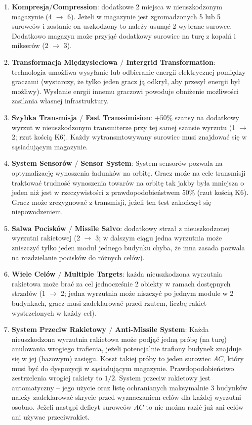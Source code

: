 \documentclass[11pt,a4paper]{article}
\begin{document}
\begin{enumerate}
\item \textbf{Kompresja$/$Compression}: dodatkowe 2 miejsca w nieuszkodzonym magazynie (4 $\to$ 6). Jeżeli w magazynie jest zgromadzonych 5 lub 5 surowców i zostanie on uszkodzony to należy usunąć 2 wybrane surowce. Dodatkowo magazyn może przyjąć dodatkowy surowiec na turę z kopalń i mikserów (2 $\to$ 3).
\item \textbf{Transformacja Międzysieciowa $/$ Intergrid Transformation}: technologia umożliwa wysyłanie lub odbieranie energii elektrycznej pomiędzy graczami (wystarczy, że tylko jeden gracz ją odkrył, aby przesył energii był możliwy). Wysłanie enrgii innemu graczowi powoduje obniżenie możliwości zasilania własnej infrastruktury.
\item \textbf{Szybka Transmisja $/$ Fast Transsimision}: +50\% szansy na dodatkowy wyrzut w nieuszkodzonym transmiterze przy tej samej szansie wyrzutu (1 $\to$ 2; rzut kością K6). Każdy wytransmtowywany surowiec musi znajdować się w sąsiadującym magazynie.
\item \textbf{System Sensorów $/$ Sensor System}: System sensorów pozwala na optymalizację wynoszenia ładunków na orbitę. Gracz może na cele transmisji traktować trudność wynoszenia towarów na orbitę tak jakby była mniejsza o jeden niż jest w rzeczywistości z prawdopodobieństwem 50\% (rzut kością K6). Gracz może zrezygnować z transmisji, jeżeli ten test zakończył się niepowodzeniem.
\item \textbf{Salwa Pocisków $/$ Missile Salvo}: dodatkowy strzał z nieuszkodzonej wyrzutni rakietowej (2 $\to$ 3; w dalszym ciągu jedna wyrzutnia może zniszczyć tylko jeden moduł jednego budynku chyba, że inna zasada pozwala na rozdzielanie pocisków do różnych celów).
\item \textbf{Wiele Celów $/$ Multiple Targets}: każda nieuszkodzona wyrzutnia rakietowa może brać za cel jednocześnie 2 obiekty w ramach dostępnych strzałów (1 $\to$ 2; jedna wyrzutnia może niszczyć po jednym module w 2 budynkach, gracz musi zadeklarować przed rzutem, liczbę rakiet wystrzelonych w każdy cel).
\item \textbf{System Przeciw Rakietowy $/$ Anti-Missile System}: Każda nieuszkodzona wyrzutnia rakietowa może podjąć jedną próbę (na turę) anulowania wrogiego trafienia, jeżeli potencjalnie trafiony budynek znajduje się w jej (bazowym) zasięgu. Koszt takiej próby to jeden surowiec $AC$, który musi być do dyspozycji w sąsiadującym magazynie. Prawdopodobieństwo zestrzelenia wrogiej rakiety to $1/2$. System przeciw rakietowy jest automatyczny -- jego użycie oraz listę ochranianych maksymalnie 3 budynków należy zadeklarować skrycie przed wyznaczaniem celów dla każdej wyrzutni osobno. Jeżeli nastąpi deficyt surowców $AC$ to nie można razić już ani celów ani używac przeciwrakiet.

\end{enumerate}
\end{document}
